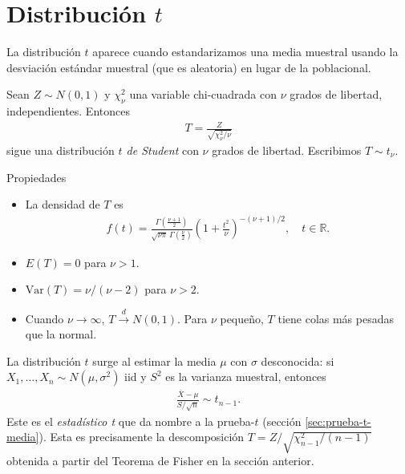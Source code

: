 \section{Distribución $t$}
\label{sec:distribucion-t}

La distribuci\'on $t$ aparece cuando estandarizamos una media muestral usando la
desviaci\'on est\'andar muestral (que es aleatoria) en lugar de la poblacional.

\begin{definicion}
Sean $Z \sim N(0,1)$ y $\chi^2_\nu$ una variable chi-cuadrada con $\nu$ grados de
libertad, independientes. Entonces
\begin{align}
 \label{eq:3.2.12}
 T = \frac{Z}{\sqrt{\chi^2_\nu / \nu}}
\end{align}
sigue una distribuci\'on \emph{$t$ de Student} con $\nu$ grados de libertad. Escribimos
$T \sim t_\nu$.
\end{definicion}

{Propiedades}
\begin{itemize}
 \item La densidad de $T$ es
 \begin{align}
  \label{eq:3.2.13}
  f(t) = \frac{\Gamma\!\left(\frac{\nu+1}{2}\right)}{\sqrt{\nu\pi}\,\Gamma\!\left(\frac{\nu}{2}\right)}
  \left(1 + \frac{t^2}{\nu}\right)^{-(\nu+1)/2}, \quad t \in \mathbb{R}.
 \end{align}
 \item $E(T) = 0$ para $\nu > 1$.
 \item $\text{Var}(T) = \nu/(\nu - 2)$ para $\nu > 2$.
 \item Cuando $\nu \to \infty$, $T \xrightarrow{d} N(0,1)$. Para $\nu$ peque\~no,
 $T$ tiene colas m\'as pesadas que la normal.
\end{itemize}

\begin{observacion}
La distribuci\'on $t$ surge al estimar la media $\mu$ con $\sigma$ desconocida:
si $X_1, \ldots, X_n \sim N(\mu, \sigma^2)$ iid y $S^2$ es la varianza muestral,
entonces
\begin{align}
 \label{eq:3.2.14}
 \frac{\bar{X} - \mu}{S/\sqrt{n}} \sim t_{n-1}.
\end{align}
Este es el \emph{estad\'istico t} que da nombre a la prueba-$t$ (secci\'on \ref{sec:prueba-t-media}). Esta
es precisamente la descomposici\'on $T = Z/\sqrt{\chi^2_{n-1}/(n-1)}$ obtenida a
partir del Teorema de Fisher en la secci\'on anterior.
\end{observacion}

